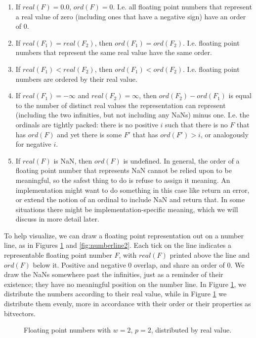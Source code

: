 \documentclass[letterpaper,10pt]{article}
\begin{document}
\begin{enumerate}
 \item If $real(F) = 0.0$, $ord(F) = 0$. I.e. all floating point numbers that represent a real value of zero (including ones that have a negative sign) have an order of 0.
 \item If $real(F_1) = real(F_2)$, then $ord(F_1) = ord(F_2)$. I.e. floating point numbers that represent the same real value have the same order.
 \item If $real(F_1) < real(F_2)$, then $ord(F_1) < ord(F_2)$. I.e. floating point numbers are ordered by their real value.
 \item If $real(F_1) = -\infty$ and $real(F_2) = \infty$, then $ord(F_2) - ord(F_1)$ is equal to the number of distinct real values the representation can represent (including the two infinities, but not including any NaNs) minus one. I.e. the ordinals are tightly packed: there is no positive $i$ such that there is no $F$ that has $ord(F)$ and yet there is some $F'$ that has $ord(F') > i$, or analogously for negative $i$.
 \item If $real(F)$ is NaN, then $ord(F)$ is undefined. In general, the order of a floating point number that represents NaN cannot be relied upon to be meaningful, so the safest thing to do is refuse to assign it meaning. An implementation might want to do something in this case like return an error, or extend the notion of an ordinal to include NaN and return that. In some situations there might be implementation-specific meaning, which we will discuss in more detail later.
\end{enumerate}

To help visualize, we can draw a floating point representation out on a number line, as in Figures \ref{fig:numberline1} and \ref{fig:numberline2}. Each tick on the line indicates a representable floating point number $F$, with $real(F)$ printed above the line and $ord(F)$ below it. Positive and negative 0 overlap, and share an order of 0. We draw the NaNs somewhere past the infinities, just as a reminder of their existence; they have no meaningful position on the number line. In Figure \ref{fig:numberline1}, we distribute the numbers according to their real value, while in Figure \ref{fig:numberline1} we distribute them evenly, more in accordance with their order or their properties as bitvectors.

\begin{figure}[t!]
 \centering
 \caption{Floating point numbers with $w=2$, $p=2$, distributed by real value.} \label{fig:numberline1}
 \smallskip
 \centering
\end{figure}
\end{document}
